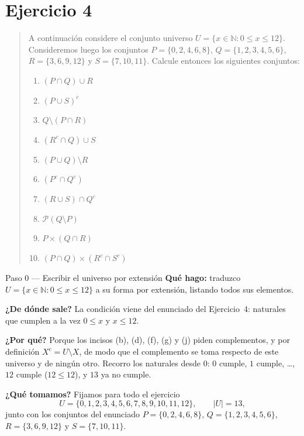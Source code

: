\documentclass[11pt]{article}
\begin{document}
\section*{Ejercicio 4}

\begin{quote}
A continuación considere el conjunto universo $U=\{x\in\mathbb{N}: 0\le x\le 12\}$.
Consideremos luego los conjuntos $P=\{0,2,4,6,8\}$, $Q=\{1,2,3,4,5,6\}$, $R=\{3,6,9,12\}$ y
$S=\{7,10,11\}$. Calcule entonces los siguientes conjuntos:

\begin{enumerate}[label=(\alph*),leftmargin=*]
	\item $(P\cap Q)\cup R$
	\item $(P\cup S)^{c}$
	\item $Q\setminus(P\cap R)$
	\item $(R^{c}\cap Q)\cup S$
	\item $(P\cup Q)\setminus R$
	\item $(P^{c}\cap Q^{c})$
	\item $(R\cup S)\cap Q^{c}$
	\item $\mathcal{P}(Q\setminus P)$
	\item $P\times(Q\cap R)$
	\item $(P\cap Q)\times(R^{c}\cap S^{c})$
\end{enumerate}
\end{quote}

\begin{paso}{Paso 0 --- Escribir el universo por extensión}
\textbf{Qué hago:} traduzco $U=\{x\in\mathbb{N}: 0\le x\le 12\}$ a su forma por extensión,
listando todos sus elementos.

\textbf{¿De dónde sale?} La condición viene del enunciado del Ejercicio~4: naturales que
cumplen a la vez $0\le x$ y $x\le 12$.

\textbf{¿Por qué?} Porque los incisos (b), (d), (f), (g) y (j) piden complementos, y por
definición $X^{c}=U\setminus X$, de modo que el complemento se toma respecto de este universo
y de ningún otro. Recorro los naturales desde $0$: $0$ cumple, $1$ cumple, \dots, $12$ cumple
($12\le 12$), y $13$ ya no cumple.

\textbf{¿Qué tomamos?} Fijamos para todo el ejercicio
\[
U=\{0,1,2,3,4,5,6,7,8,9,10,11,12\},\qquad |U|=13,
\]
junto con los conjuntos del enunciado $P=\{0,2,4,6,8\}$, $Q=\{1,2,3,4,5,6\}$,
$R=\{3,6,9,12\}$ y $S=\{7,10,11\}$.
\end{paso}
\end{document}
